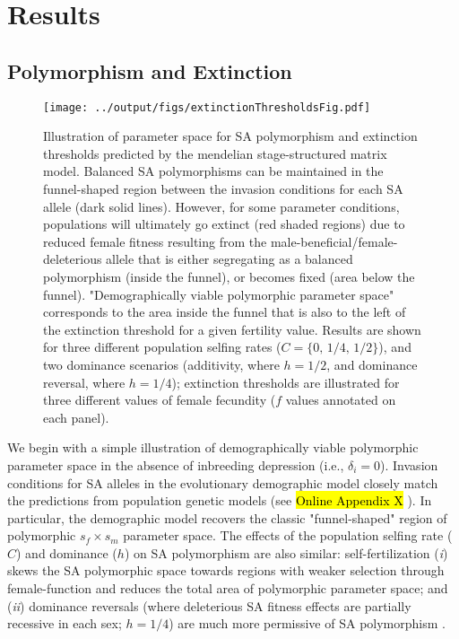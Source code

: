 \documentclass[11pt]{article}
\begin{document}

\section{Results}\label{sec:Results}

\subsection{Polymorphism and Extinction}\label{subsec:PolyExt}


 \begin{figure}[htbp]
 \centering
 \texttt{[image: ../output/figs/extinctionThresholdsFig.pdf]}
 \caption{\footnotesize{Illustration of parameter space for SA polymorphism and extinction thresholds predicted by the mendelian stage-structured matrix model. Balanced SA polymorphisms can be maintained in the funnel-shaped region between the invasion conditions for each SA allele (dark solid lines). However, for some parameter conditions, populations will ultimately go extinct (red shaded regions) due to reduced female fitness resulting from the male-beneficial/female-deleterious allele that is either segregating as a balanced polymorphism (inside the funnel), or becomes fixed (area below the funnel). "Demographically viable polymorphic parameter space" corresponds to the area inside the funnel that is also to the left of the extinction threshold for a given fertility value. Results are shown for three different population selfing rates ($C = \{0,\,1/4,\,1/2\}$), and two dominance scenarios (additivity, where $h = 1/2$, and dominance reversal, where $h = 1/4$); extinction thresholds are illustrated for three different values of female fecundity ($f$ values annotated on each panel).}}
 \label{fig:extThresholds}
 \end{figure}

We begin with a simple illustration of demographically viable polymorphic parameter space in the absence of inbreeding depression (i.e., $\delta_i = 0$). Invasion conditions for SA alleles in the evolutionary demographic model closely match the predictions from population genetic models (see \hl{Online Appendix X} \citealt{Kidwell1977, JordanConnallon2014, Olito2017}). In particular, the demographic model recovers the classic "funnel-shaped" region of polymorphic $s_f \times s_m$ parameter space. The effects of the population selfing rate ($C$) and dominance ($h$) on SA polymorphism are also similar: self-fertilization ({\itshape i}) skews the SA polymorphic space towards regions with weaker selection through female-function and reduces the total area of polymorphic parameter space; and ({\itshape ii}) dominance reversals (where deleterious SA fitness effects are partially recessive in each sex; $h = 1/4$) are much more permissive of SA polymorphism \citep{JordanConnallon2014, Olito2017}. 
\end{document}
